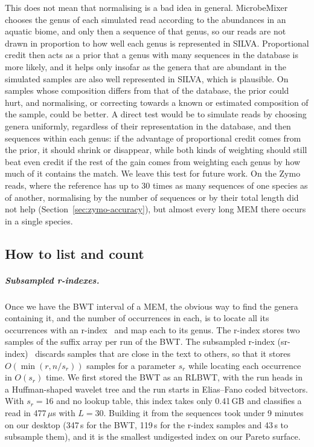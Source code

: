 This does not mean that normalising is a bad idea in general.
MicrobeMixer chooses the genus of each simulated read according to the abundances in an aquatic biome, and only then a sequence of that genus, so our reads are not drawn in proportion to how well each genus is represented in SILVA.
Proportional credit then acts as a prior that a genus with many sequences in the database is more likely, and it helps only insofar as the genera that are abundant in the simulated samples are also well represented in SILVA, which is plausible.
On samples whose composition differs from that of the database, the prior could hurt, and normalising, or correcting towards a known or estimated composition of the sample, could be better.
A direct test would be to simulate reads by choosing genera uniformly, regardless of their representation in the database, and then sequences within each genus: if the advantage of proportional credit comes from the prior, it should shrink or disappear, while both kinds of weighting should still beat even credit if the rest of the gain comes from weighting each genus by how much of it contains the match.
We leave this test for future work.
On the Zymo reads, where the reference has up to 30 times as many sequences of one species as of another, normalising by the number of sequences or by their total length did not help (Section~\ref{sec:zymo-accuracy}), but almost every long MEM there occurs in a single species.

\subsection{How to list and count}
\label{app:listing}
\label{sec:sr}
\label{sec:rlcsa}

\subparagraph*{Subsampled r-indexes.}
Once we have the BWT interval of a MEM, the obvious way to find the genera containing it, and the number of occurrences in each, is to locate all its occurrences with an r-index~\cite{GagieNavarroPrezza2020} and map each to its genus.
The r-index stores two samples of the suffix array per run of the BWT.
The subsampled r-index (sr-index)~\cite{CGN21,CGN25} discards samples that are close in the text to others, so that it stores $O(\min(r, n/s_r))$ samples for a parameter $s_r$ while locating each occurrence in $O(s_r)$ time.
We first stored the BWT as an RLBWT, with the run heads in a Huffman-shaped wavelet tree and the run starts in Elias--Fano coded bitvectors.
With $s_r = 16$ and no lookup table, this index takes only 0.41\,GB and classifies a read in 477\,$\mu$s with $L = 30$.
Building it from the sequences took under 9 minutes on our desktop (347\,s for the BWT, 119\,s for the r-index samples and 43\,s to subsample them), and it is the smallest undigested index on our Pareto surface.

